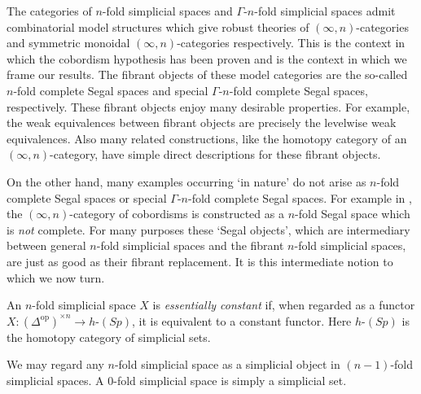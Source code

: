 \documentclass{amsart}
\begin{document}
The categories of $n$-fold simplicial spaces and $\Gamma$-$n$-fold simplicial spaces admit combinatorial model structures which give robust theories of $(\infty, n)$-categories and symmetric monoidal $(\infty, n)$-categories respectively. This is the context in which the cobordism hypothesis has been proven and is the context in which we frame our results. The fibrant objects of these model categories are the so-called $n$-fold complete Segal spaces and special $\Gamma$-$n$-fold complete Segal spaces, respectively. These fibrant objects enjoy many desirable properties. For example, the weak equivalences between fibrant objects are precisely the levelwise weak equivalences. Also many related constructions, like the homotopy category of an $(\infty, n)$-category, have simple direct descriptions for these fibrant objects. 

On the other hand, many examples occurring `in nature' do not arise as $n$-fold complete Segal spaces or special $\Gamma$-$n$-fold complete Segal spaces. For example in \cite{Lurie}, the $(\infty, n)$-category of cobordisms is constructed as a $n$-fold Segal space which is {\em not} complete. For many purposes these `Segal objects', which are intermediary between general $n$-fold simplicial spaces and the fibrant $n$-fold simplicial spaces, are just as good as their fibrant replacement. It is this intermediate notion to which we now turn. 

\begin{definition}
	An $n$-fold simplicial space $X$ is {\em essentially constant} if, when regarded as a functor $X: (\Delta^\textrm{op})^{\times n} \to h\textrm{-}(Sp)$, it is equivalent to a constant functor. Here $h\textrm{-}(Sp)$ is the homotopy category of simplicial sets.  
\end{definition}


We may regard any $n$-fold simplicial space as a simplicial object in $(n-1)$-fold simplicial spaces. A $0$-fold simplicial space is simply a simplicial set. 
\end{document}
